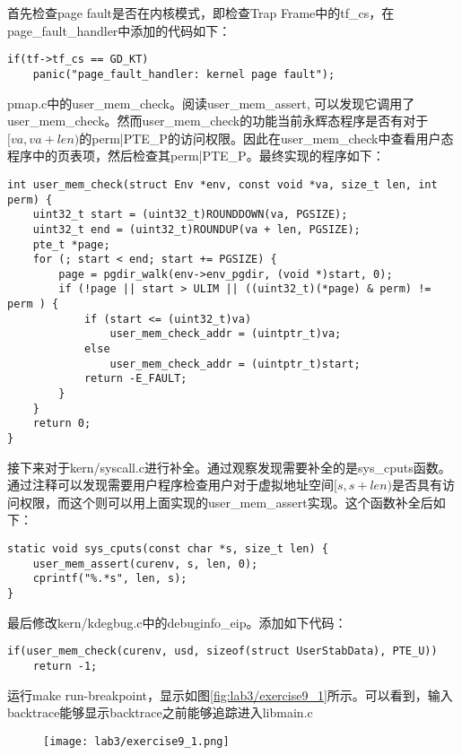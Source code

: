 \begin{exerciseSolution}{9}
    \par 首先检查page fault是否在内核模式，即检查Trap Frame中的tf\_cs，在page\_fault\_handler中添加的代码如下：
    \begin{lstlisting}
if(tf->tf_cs == GD_KT)
    panic("page_fault_handler: kernel page fault");
    \end{lstlisting}
    \par pmap.c中的user\_mem\_check。阅读user\_mem\_assert, 可以发现它调用了user\_mem\_check。然而user\_mem\_check的功能当前永辉态程序是否有对于$[va, va+len)$的perm|PTE\_P的访问权限。因此在user\_mem\_check中查看用户态程序中的页表项，然后检查其perm|PTE\_P。最终实现的程序如下：
    \begin{lstlisting}
int user_mem_check(struct Env *env, const void *va, size_t len, int perm) {
    uint32_t start = (uint32_t)ROUNDDOWN(va, PGSIZE);
    uint32_t end = (uint32_t)ROUNDUP(va + len, PGSIZE);
    pte_t *page;
    for (; start < end; start += PGSIZE) {
        page = pgdir_walk(env->env_pgdir, (void *)start, 0);
        if (!page || start > ULIM || ((uint32_t)(*page) & perm) != perm ) {
            if (start <= (uint32_t)va)
                user_mem_check_addr = (uintptr_t)va;
            else
                user_mem_check_addr = (uintptr_t)start;
            return -E_FAULT;
        }
    }
    return 0;
}
    \end{lstlisting}
    \par 接下来对于kern/syscall.c进行补全。通过观察发现需要补全的是sys\_cputs函数。通过注释可以发现需要用户程序检查用户对于虚拟地址空间$[s, s+len)$是否具有访问权限，而这个则可以用上面实现的user\_mem\_assert实现。这个函数补全后如下：
    \begin{lstlisting}
static void sys_cputs(const char *s, size_t len) {
    user_mem_assert(curenv, s, len, 0);
    cprintf("%.*s", len, s);
}
    \end{lstlisting}
    \par 最后修改kern/kdegbug.c中的debuginfo\_eip。添加如下代码：
    \begin{lstlisting}
if(user_mem_check(curenv, usd, sizeof(struct UserStabData), PTE_U))
    return -1;
    \end{lstlisting}
    \par 运行make run-breakpoint，显示如图\ref{fig:lab3/exercise9_1}所示。可以看到，输入backtrace能够显示backtrace之前能够追踪进入libmain.c
    \begin{figure}[htb]
        \centering
        \texttt{[image: lab3/exercise9\_1.png]}

\end{figure}
\end{exerciseSolution}
